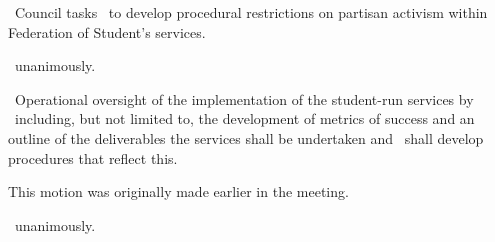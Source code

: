 \begin{motion}
    \birt\ Council tasks \ppc\ to develop procedural restrictions on partisan
    activism within Federation of Student's services.
    \movers{\seneca}{\katie}

    \carries\ unanimously.
\end{motion}

\begin{motion}
    \birt\ Operational oversight of the implementation of the student-run
    services by \clac\ including, but not limited to, the development of metrics
    of success and an outline of the deliverables the services shall be
    undertaken and \ppc\ shall develop procedures that reflect this.
    \movers{\seneca}{\katie}

    This motion was originally made earlier in the meeting.

    \carries\ unanimously.
\end{motion}
